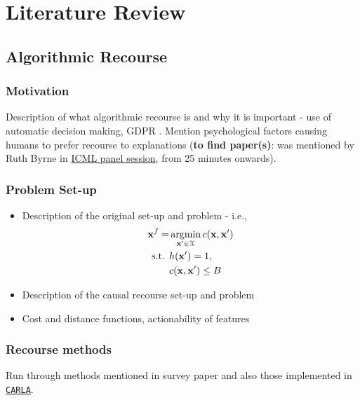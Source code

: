 \chapter{Literature Review} \label{chapter:lit_review}

\section{Algorithmic Recourse}

\subsection{Motivation}
Description of what algorithmic recourse is and why it is important - use of automatic decision making, GDPR \citep{voigtEUGeneralData2017}. Mention psychological factors causing humans to prefer recourse to explanations (\textbf{to find paper(s)}: was mentioned by Ruth Byrne in \href{https://icml.cc/virtual/2021/11705}{ICML panel session}, from 25 minutes onwards).


\subsection{Problem Set-up}
\begin{itemize}
	\item Description of the original set-up and problem - i.e., 	
	\begin{align} \label{eq:recourse_setup}
		\mathbf{x}^f = & \operatorname*{argmin}_{\mathbf{x}' \in \mathbf{\mathcal{X}}} c(\mathbf{x},\mathbf{x}') \\
		\text{s.t. } & h(\mathbf{x}') = 1, \nonumber \\ 
		& c(\mathbf{x},\mathbf{x}') \leq B \nonumber
	\end{align} 
	
	\item Description of the causal recourse set-up and problem \citep{karimiAlgorithmicRecourseCounterfactual2021}
	\item Cost and distance functions, actionability of features
\end{itemize}


\subsection{Recourse methods}
Run through methods mentioned in survey paper \citep{karimiSurveyAlgorithmicRecourse2022} and also those implemented in \href{https://carla-counterfactual-and-recourse-library.readthedocs.io/en/latest/recourse.html}{\texttt{CARLA}}.





